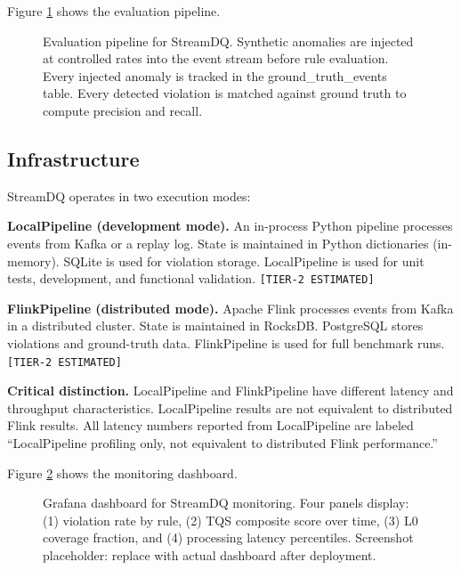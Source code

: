 Figure \ref{fig:experimental-pipeline} shows the evaluation pipeline.

\begin{figure}[htbp]
  \centering
  \caption{Evaluation pipeline for StreamDQ. Synthetic anomalies are injected
    at controlled rates into the event stream before rule evaluation. Every
    injected anomaly is tracked in the ground\_truth\_events table. Every
    detected violation is matched against ground truth to compute precision
    and recall.}
  \label{fig:experimental-pipeline}
\end{figure}

\subsection{Infrastructure}

StreamDQ operates in two execution modes:

\textbf{LocalPipeline (development mode).} An in-process Python pipeline
processes events from Kafka or a replay log. State is maintained in Python
dictionaries (in-memory). SQLite is used for violation storage. LocalPipeline
is used for unit tests, development, and functional validation.
\texttt{[TIER-2\ ESTIMATED]}

\textbf{FlinkPipeline (distributed mode).} Apache Flink processes events
from Kafka in a distributed cluster. State is maintained in RocksDB.
PostgreSQL stores violations and ground-truth data. FlinkPipeline is used
for full benchmark runs.
\texttt{[TIER-2\ ESTIMATED]}

\textbf{Critical distinction.} LocalPipeline and FlinkPipeline have
different latency and throughput characteristics. LocalPipeline results are
not equivalent to distributed Flink results. All latency numbers reported
from LocalPipeline are labeled ``LocalPipeline profiling only, not
equivalent to distributed Flink performance.''

Figure \ref{fig:dashboard-mockup} shows the monitoring dashboard.

\begin{figure}[htbp]
  \centering
  \caption{Grafana dashboard for StreamDQ monitoring. Four panels display:
    (1) violation rate by rule, (2) TQS composite score over time,
    (3) L0 coverage fraction, and (4) processing latency percentiles.
    Screenshot placeholder: replace with actual dashboard after deployment.}
  \label{fig:dashboard-mockup}
\end{figure}

